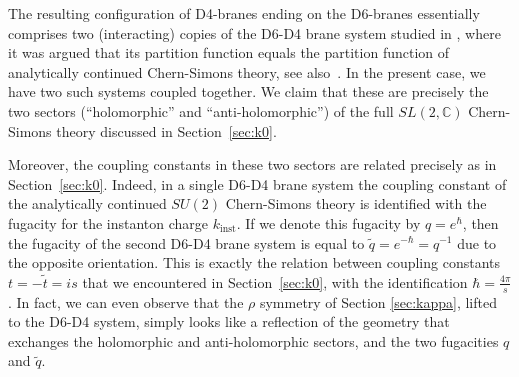 \documentclass[11pt,letterpaper]{article}
\numberwithin{equation}{section}
\newcommand{\C}{{\mathbb C}}
\begin{document}
The resulting configuration of D4-branes ending on the D6-branes essentially comprises two (interacting) copies
of the D6-D4 brane system studied in \cite{Wfiveknots}, where it was argued that its partition
function equals the partition function of analytically continued Chern-Simons theory, see also~\cite{DGH}.
In the present case, we have two such systems coupled together. We claim that these are precisely the
two sectors (``holomorphic'' and ``anti-holomorphic'') of the full $SL(2,\C)$ Chern-Simons theory discussed in Section~\ref{sec:k0}.

Moreover, the coupling constants in these two sectors are related precisely as in Section~\ref{sec:k0}.
Indeed, in a single D6-D4 brane system the coupling constant of the analytically continued $SU(2)$ Chern-Simons theory
is identified with the fugacity for the instanton charge $k_{\text{inst}}$. If we denote this fugacity by $q = e^{\hbar}$,
then the fugacity of the second D6-D4 brane system is equal to $\tilde q = e^{- \hbar} = q^{-1}$ due to the opposite orientation.
This is exactly the relation between coupling constants $t = - \tilde t = is$ that we encountered in Section~\ref{sec:k0},
with the identification $\hbar = \frac{4 \pi}{s}$. In fact, we can even observe that the $\rho$ symmetry of Section \ref{sec:kappa}, lifted to the D6-D4 system, simply looks like a reflection of the geometry that exchanges the holomorphic and anti-holomorphic sectors, and the two fugacities $q$ and $\tilde q$. \\







 \\
\end{document}
